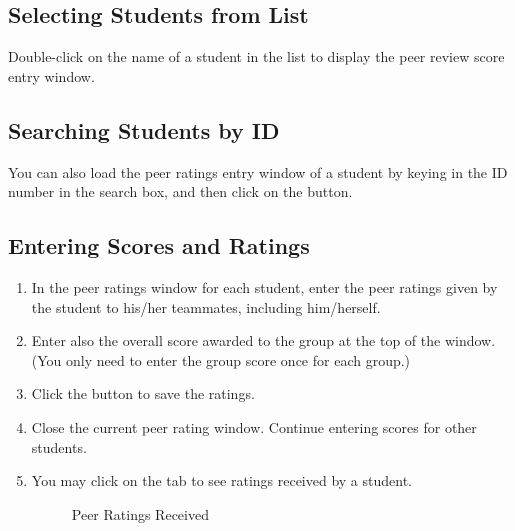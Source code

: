 \documentclass[a4paper,11pt]{refart}
\begin{document}
	\subsection{Selecting Students from List}
	
	Double-click on the name of a student in the list to display the peer review score entry window.
	
	\subsection{Searching Students by ID}
	
	You can also load the peer ratings entry window of a student by keying in the ID number in the search box, and then click on the  button.
	
	\subsection{Entering Scores and Ratings}
	
	\begin{enumerate}
		\begin{figure}[hbt!]
			\caption{Peer Ratings Window}
		\end{figure}
		
		\item In the peer ratings window for each student, enter the peer ratings given by the student to his/her teammates, including him/herself.
		\item Enter also the overall score awarded to the group at the top of the window. (You only need to enter the group score once for each group.)
		\item Click the   button to save the ratings.
		\item Close the current peer rating window. Continue entering scores for other students.
		\item You may click on the  tab to see ratings received by a student.
		
		\begin{figure}[hbt!]
			\caption{Peer Ratings Received}
		\end{figure}
		
	\end{enumerate}
	
\end{document}
